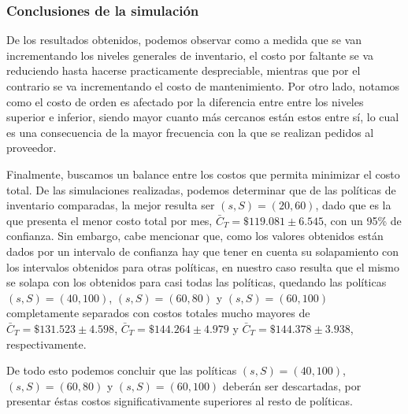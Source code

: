 \subsubsection{Conclusiones de la simulación}
    De los resultados obtenidos, podemos observar como a medida que se van incrementando los niveles generales de inventario, el costo por faltante se va reduciendo hasta hacerse practicamente despreciable, mientras que por el contrario se va incrementando el costo de mantenimiento. Por otro lado, notamos como el costo de orden es afectado por la diferencia entre entre los niveles superior e inferior, siendo mayor cuanto más cercanos están estos entre sí, lo cual es una consecuencia de la mayor frecuencia con la que se realizan pedidos al proveedor.

    Finalmente, buscamos un balance entre los costos que permita minimizar el costo total. De las simulaciones realizadas, podemos determinar que de las políticas de inventario comparadas, la mejor resulta ser $(s,S)=(20,60)$, dado que es la que presenta el menor costo total por mes, $\bar{C}_{T}=\$ 119.081 \pm 6.545$, con un 95\% de confianza. Sin embargo, cabe mencionar que, como los valores obtenidos están dados por un intervalo de confianza hay que tener en cuenta su solapamiento con los intervalos obtenidos para otras políticas, en nuestro caso resulta que el mismo se solapa con los obtenidos para casi todas las políticas, quedando las políticas $(s,S)=(40, 100)$, $(s,S)=(60,80)$ y $(s,S)=(60,100)$ completamente separados con costos totales mucho mayores de $\bar{C}_{T}=\$ 131.523 \pm 4.598$, $\bar{C}_{T}=\$ 144.264 \pm 4.979$ y $\bar{C}_{T}=\$ 144.378 \pm 3.938$, respectivamente.

    De todo esto podemos concluir que las políticas $(s,S)=(40,100)$, $(s,S)=(60,80)$ y $(s,S)=(60,100)$ deberán ser descartadas, por presentar éstas costos significativamente superiores al resto de políticas.